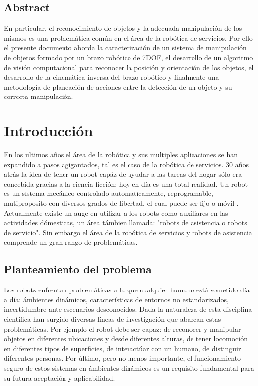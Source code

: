 \documentclass[a4paper, openright, 12pt]{report}
\begin{document}
\newpage{}
\section*{Abstract}
	En particular, el reconocimiento de objetos y la adecuada manipulación de los mismos es una problemática común en el área de la robótica de servicios. Por ello el presente documento aborda la caracterización de un sistema de manipulación de objetos formado por un brazo robótico de 7DOF, el desarrollo de un algoritmo de visión computacional para reconocer la posición y orientación de los objetos, el desarrollo de la cinemática inversa del brazo robótico y finalmente una metodología de planeación de acciones entre la detección de un objeto y su correcta manipulación.




\chapter{Introducción}
	En los ultimos años el área de la robótica y sus multiples aplicaciones se han expandido a pasos agigantados, tal es el caso de la robótica de servicios. 30 años atrás la idea de tener un robot capáz de ayudar a las tareas del hogar sólo era concebida gracias a la ciencia ficción; hoy en día es una total realidad. Un robot es un sistema mecánico controlado automaticamente, reprogramable, mutiproposito con diversos grados de libertad, el cual puede ser fijo o móvil \cite{khalil2004}. Actualmente existe un auge en utilizar a los robots como auxiliares en las actividades dómesticas, un área támbien llamada: "robots de asistencia o robots de servicio". Sin embargo el área de la robótica de servicios y robots de asistencia comprende un gran rango de problemáticas.\\

	\section{Planteamiento del problema}
		Los robots enfrentan problemáticas a la que cualquier humano está sometido día a día: ámbientes dinámicos, características de entornos no estandarizados, incertidumbre ante escenarios desconocidos. Dada la naturaleza de esta disciplina cientifica han surgido diversas líneas de investigación que abarcan estas problemáticas. Por ejemplo el robot debe ser capaz: de reconocer y manipular objetos en diferentes ubicaciones y desde diferentes alturas, de tener locomoción en diferentes tipos de superficies, de interactúar con un humano, de distinguir diferentes personas. Por último, pero no menos importante, el funcionamiento seguro de estos sistemas en ámbientes dinámicos es un requisito fundamental para su futura aceptación y aplicabilidad.\\
\end{document}
